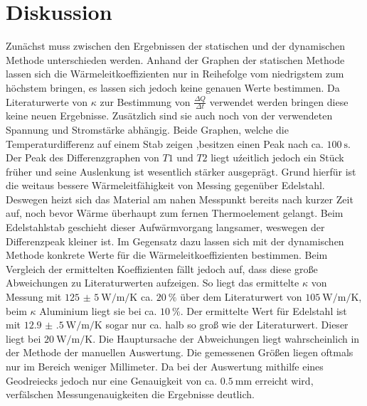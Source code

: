 
\section{Diskussion}
\label{sec:Diskussion}
Zunächst muss zwischen den Ergebnissen der statischen und der dynamischen Methode
 unterschieden werden. Anhand der Graphen der statischen Methode lassen sich
 die Wärmeleitkoeffizienten nur in Reihefolge vom niedrigstem zum höchstem bringen,
 es lassen sich jedoch keine genauen Werte bestimmen. Da Literaturwerte
 von $\kappa$ zur Bestimmung von $\frac{\Delta Q}{\Delta t}$ verwendet werden
 bringen diese keine neuen Ergebnisse. Zusätzlich sind sie auch noch von der
 verwendeten Spannung und Stromstärke abhängig. Beide Graphen, welche die
 Temperaturdifferenz auf einem Stab zeigen ,besitzen einen Peak nach
 ca. $\SI{100}{\second}$. Der Peak des Differenzgraphen von $T1$ und $T2$ 
liegt uźeitlich jedoch ein Stück früher und seine Auslenkung ist wesentlich stärker ausgeprägt. Grund hierfür ist die  weitaus bessere
 Wärmeleitfähigkeit von Messing gegenüber Edelstahl. Deswegen heizt sich das
 Material am nahen Messpunkt bereits nach kurzer Zeit auf, noch bevor Wärme
 überhaupt zum fernen Thermoelement gelangt. Beim Edelstahlstab geschieht
 dieser Aufwärmvorgang langsamer, weswegen der Differenzpeak kleiner ist. Im
 Gegensatz dazu lassen sich mit der dynamischen Methode konkrete Werte für die
 Wärmeleitkoeffizienten bestimmen. Beim Vergleich der ermittelten Koeffizienten
  fällt jedoch auf, dass diese große Abweichungen zu Literaturwerten\cite{km} aufzeigen.
  So liegt das ermittelte $\kappa$ von Messung mit
  $\SI{125(5)}{\watt\per\meter\per\kelvin}$ ca. $\SI{20}{\percent}$ über
  dem Literaturwert von $\SI{105}{\watt\per\meter\per\kelvin}$\cite{km}, beim $\kappa$
  Aluminium liegt sie bei ca. $\SI{10}{\percent}$. Der ermittelte Wert für
  Edelstahl ist mit $\SI{12.9(5)}{\watt\per\meter\per\kelvin}$ sogar
   nur ca. halb so groß wie der Literaturwert. Dieser liegt bei $\SI{20}{\watt\per\meter\per\kelvin}$\cite{km}.
   Die Hauptursache der Abweichungen liegt wahrscheinlich in der Methode der manuellen
   Auswertung. Die gemessenen Größen liegen oftmals nur im Bereich weniger Millimeter.
   Da bei der Auswertung mithilfe eines Geodreiecks jedoch nur eine
   Genauigkeit von ca. $\SI{0.5}{\milli\meter}$ erreicht wird, verfälschen
   Messungenauigkeiten die Ergebnisse deutlich.
